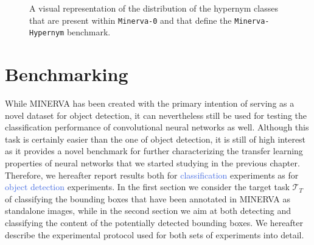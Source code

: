 \begin{figure}[htb!]
	
	\caption{A visual representation of the distribution of the hypernym classes that are present within \texttt{Minerva-0} and that define the \texttt{Minerva-Hypernym} benchmark.}
	\label{fig:hypernym_distribution}
\end{figure}


\section{Benchmarking}
\label{sec:benchmarking}

While MINERVA has been created with the primary intention of serving as a novel dataset for object detection, it can nevertheless still be used for testing the classification performance of convolutional neural networks as well. Although this task is certainly easier than the one of object detection, it is still of high interest as it provides a novel benchmark for further characterizing the transfer learning properties of neural networks that we started studying in the previous chapter. Therefore, we hereafter report results both for \textcolor{RoyalBlue}{classification} experiments as for \textcolor{RoyalBlue}{object detection} experiments. In the first section we consider the target task $\mathcal{T}_T$ of classifying the bounding boxes that have been annotated in MINERVA as standalone images, while in the second section we aim at both detecting and classifying the content of the potentially detected bounding boxes. We hereafter describe the experimental protocol used for both sets of experiments into detail.

